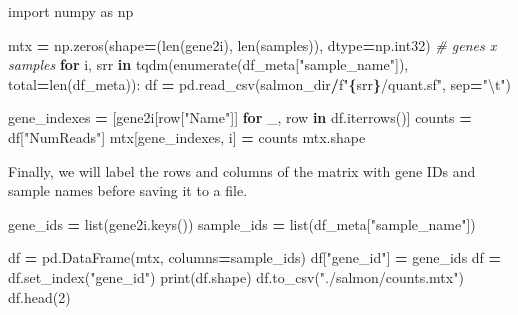 \documentclass[
]{book}
\newenvironment{Shaded}{\begin{snugshade}}{\end{snugshade}}
\newcommand{\BuiltInTok}[1]{#1}
\newcommand{\CharTok}[1]{\textcolor[rgb]{0.31,0.60,0.02}{#1}}
\newcommand{\CommentTok}[1]{\textcolor[rgb]{0.56,0.35,0.01}{\textit{#1}}}
\newcommand{\ControlFlowTok}[1]{\textcolor[rgb]{0.13,0.29,0.53}{\textbf{#1}}}
\newcommand{\DecValTok}[1]{\textcolor[rgb]{0.00,0.00,0.81}{#1}}
\newcommand{\ImportTok}[1]{#1}
\newcommand{\KeywordTok}[1]{\textcolor[rgb]{0.13,0.29,0.53}{\textbf{#1}}}
\newcommand{\NormalTok}[1]{#1}
\newcommand{\OperatorTok}[1]{\textcolor[rgb]{0.81,0.36,0.00}{\textbf{#1}}}
\newcommand{\SpecialCharTok}[1]{\textcolor[rgb]{0.81,0.36,0.00}{\textbf{#1}}}
\newcommand{\SpecialStringTok}[1]{\textcolor[rgb]{0.31,0.60,0.02}{#1}}
\newcommand{\StringTok}[1]{\textcolor[rgb]{0.31,0.60,0.02}{#1}}
\begin{document}
\begin{Shaded}
\begin{Highlighting}[numbers=left,,]
\ImportTok{import}\NormalTok{ numpy }\ImportTok{as}\NormalTok{ np}

\NormalTok{mtx }\OperatorTok{=}\NormalTok{ np.zeros(shape}\OperatorTok{=}\NormalTok{(}\BuiltInTok{len}\NormalTok{(gene2i), }\BuiltInTok{len}\NormalTok{(samples)), dtype}\OperatorTok{=}\NormalTok{np.int32) }\CommentTok{\# genes x samples}
\ControlFlowTok{for}\NormalTok{ i, srr }\KeywordTok{in}\NormalTok{ tqdm(}\BuiltInTok{enumerate}\NormalTok{(df\_meta[}\StringTok{"sample\_name"}\NormalTok{]), total}\OperatorTok{=}\BuiltInTok{len}\NormalTok{(df\_meta)):}
\NormalTok{    df }\OperatorTok{=}\NormalTok{ pd.read\_csv(salmon\_dir}\OperatorTok{/}\SpecialStringTok{f"}\SpecialCharTok{\{}\NormalTok{srr}\SpecialCharTok{\}}\SpecialStringTok{/quant.sf"}\NormalTok{, sep}\OperatorTok{=}\StringTok{"}\CharTok{\textbackslash{}t}\StringTok{"}\NormalTok{)}

\NormalTok{    gene\_indexes }\OperatorTok{=}\NormalTok{ [gene2i[row[}\StringTok{"Name"}\NormalTok{]] }\ControlFlowTok{for}\NormalTok{ \_, row }\KeywordTok{in}\NormalTok{ df.iterrows()]}
\NormalTok{    counts }\OperatorTok{=}\NormalTok{ df[}\StringTok{"NumReads"}\NormalTok{]}
\NormalTok{    mtx[gene\_indexes, i] }\OperatorTok{=}\NormalTok{ counts}
\NormalTok{mtx.shape}
\end{Highlighting}
\end{Shaded}

Finally, we will label the rows and columns of the matrix with gene IDs and sample names before saving it to a file.

\begin{Shaded}
\begin{Highlighting}[numbers=left,,]
\NormalTok{gene\_ids }\OperatorTok{=} \BuiltInTok{list}\NormalTok{(gene2i.keys())}
\NormalTok{sample\_ids }\OperatorTok{=} \BuiltInTok{list}\NormalTok{(df\_meta[}\StringTok{"sample\_name"}\NormalTok{])}

\NormalTok{df }\OperatorTok{=}\NormalTok{ pd.DataFrame(mtx, columns}\OperatorTok{=}\NormalTok{sample\_ids)}
\NormalTok{df[}\StringTok{"gene\_id"}\NormalTok{] }\OperatorTok{=}\NormalTok{ gene\_ids}
\NormalTok{df }\OperatorTok{=}\NormalTok{ df.set\_index(}\StringTok{"gene\_id"}\NormalTok{)}
\BuiltInTok{print}\NormalTok{(df.shape)}
\NormalTok{df.to\_csv(}\StringTok{"./salmon/counts.mtx"}\NormalTok{)}
\NormalTok{df.head(}\DecValTok{2}\NormalTok{)}
\end{Highlighting}
\end{Shaded}
\end{document}
